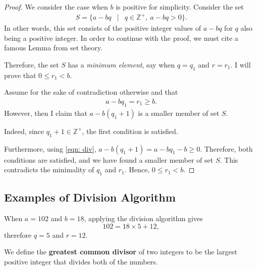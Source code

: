 \begin{proof}

We consider the case when $b$ is positive for simplicity.  Consider the set \begin{eqnarray*} S=\{a-bq &|& q \in \mathbb{Z}^{+},\:a-bq>0\}. \end{eqnarray*}  
In other words, this set consists of the positive integer values of $a-bq$ for $q$ also being a positive integer.  In order to continue with the proof, we must cite a famous Lemma from set theory.  \cite{me:1} 


\clearpage

Therefore, the set $S$ has a \textit{minimum element}, say when $q=q_1$ and $r=r_1$. I will prove that $0\le r_1<b.$  

Assume for the sake of contradiction otherwise and that \begin{eqnarray} a-bq_1=r_1\ge b. \label{eqn: div} \end{eqnarray} However, then I claim that $a-b(q_1+1)$ is a smaller member of set $S$. 

Indeed, since $q_1+1\in \mathbb{Z}^{+}$, the first condition is satisfied.

Furthermore, using \ref{eqn: div}, $a-b(q_1+1)=a-bq_1-b\ge 0$. Therefore, both conditions are satisfied, and we have found a smaller member of set $S$. This contradicts the minimality of $q_1$ and $r_1$.  Hence, $0\le r_1<b$.   \end{proof}

\clearpage

\subsection*{Examples of Division Algorithm}

When $a=102$ and $b=18$, applying the division algorithm gives $$102=18\times 5+12,$$ therefore $q=5$ and $r=12$. 

\clearpage


\begin{defi}  We define the \textbf{greatest common divisor} of two integers to be the largest positive integer that divides both of the numbers.  \end{defi}

